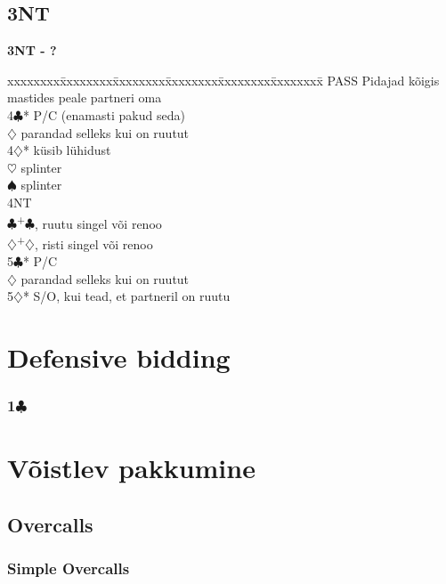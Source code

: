 \documentclass[10pt]{article}
\renewcommand{\c}{$\clubsuit$}
\renewcommand{\d}{$\diamondsuit$}
\newcommand{\h}{$\heartsuit$}
\newcommand{\s}{$\spadesuit$}
\newcommand{\p}{\textsuperscript{+}}
\newenvironment{bidtable}[1][]
{\textbf{#1}
  \begin{adjustwidth}{1em}{}
    \addvspace{2pt}
    \begin{tabbing}
      xxxxxxxx\=xxxxxxxx\=xxxxxxxx\=xxxxxxxx\=xxxxxxxx\=xxxxxxxx\=\kill}
{\end{tabbing}\end{adjustwidth}\bigskip}%
\newcommand{\pdfc}{\texorpdfstring{\c{}}{C}}
\begin{document}
\begin{multicols*}{2}
\subsection{3NT}

\begin{bidtable}[3NT - ?]
PASS \> Pidajad kõigis mastides peale partneri oma \\
4\c* \> P/C (enamasti pakud seda)                  \\
     \d \> parandad selleks kui on ruutut      \\
4\d* \> küsib lühidust                             \\
     \h \> splinter                            \\
     \s \> splinter                            \\
     \> 4NT                                 \\
     \c {}\p\c , ruutu singel või renoo      \\
     \d {}\p\d , risti singel või renoo      \\
5\c* \> P/C                                        \\
     \d \> parandad selleks kui on ruutut      \\
5\d* \> S/O, kui tead, et partneril on ruutu
\end{bidtable}

\newpage

\section{Defensive bidding}

\subsubsection{1\pdfc}




\section{Võistlev pakkumine}
\subsection{Overcalls}

\subsubsection{Simple Overcalls}


\end{multicols*}
\end{document}
